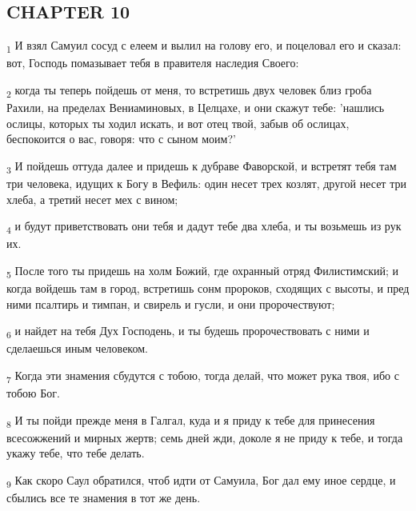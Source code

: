 \subsection{CHAPTER 10}
\begin{tcolorbox}
\textsubscript{1} И взял Самуил сосуд с елеем и вылил на голову его, и поцеловал его и сказал: вот, Господь помазывает тебя в правителя наследия Своего:
\end{tcolorbox}
\begin{tcolorbox}
\textsubscript{2} когда ты теперь пойдешь от меня, то встретишь двух человек близ гроба Рахили, на пределах Вениаминовых, в Целцахе, и они скажут тебе: 'нашлись ослицы, которых ты ходил искать, и вот отец твой, забыв об ослицах, беспокоится о вас, говоря: что с сыном моим?'
\end{tcolorbox}
\begin{tcolorbox}
\textsubscript{3} И пойдешь оттуда далее и придешь к дубраве Фаворской, и встретят тебя там три человека, идущих к Богу в Вефиль: один несет трех козлят, другой несет три хлеба, а третий несет мех с вином;
\end{tcolorbox}
\begin{tcolorbox}
\textsubscript{4} и будут приветствовать они тебя и дадут тебе два хлеба, и ты возьмешь из рук их.
\end{tcolorbox}
\begin{tcolorbox}
\textsubscript{5} После того ты придешь на холм Божий, где охранный отряд Филистимский; и когда войдешь там в город, встретишь сонм пророков, сходящих с высоты, и пред ними псалтирь и тимпан, и свирель и гусли, и они пророчествуют;
\end{tcolorbox}
\begin{tcolorbox}
\textsubscript{6} и найдет на тебя Дух Господень, и ты будешь пророчествовать с ними и сделаешься иным человеком.
\end{tcolorbox}
\begin{tcolorbox}
\textsubscript{7} Когда эти знамения сбудутся с тобою, тогда делай, что может рука твоя, ибо с тобою Бог.
\end{tcolorbox}
\begin{tcolorbox}
\textsubscript{8} И ты пойди прежде меня в Галгал, куда и я приду к тебе для принесения всесожжений и мирных жертв; семь дней жди, доколе я не приду к тебе, и тогда укажу тебе, что тебе делать.
\end{tcolorbox}
\begin{tcolorbox}
\textsubscript{9} Как скоро Саул обратился, чтоб идти от Самуила, Бог дал ему иное сердце, и сбылись все те знамения в тот же день.
\end{tcolorbox}
